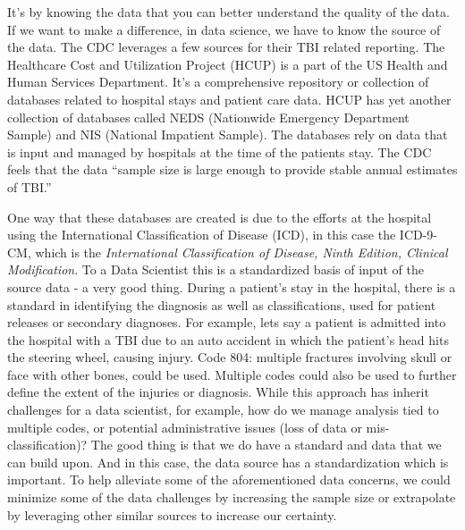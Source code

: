 \documentclass[sigconf]{acmart}
\begin{document}
It's by knowing the data that you can better understand the quality of the data.  If we want to make a difference, in data science, we have to know the source of the data.  The CDC leverages a few sources for their TBI related reporting.  The Healthcare Cost and Utilization Project (HCUP) is a part of the US Health and Human Services Department.  It's a comprehensive repository or collection of databases related to hospital stays and patient care data.  HCUP has yet another collection of databases called NEDS (Nationwide Emergency Department Sample) and NIS (National Impatient Sample).  The databases rely on data that is input and managed by hospitals at the time of the patients stay.  The CDC feels that the data ``sample size is large enough to provide stable annual estimates of TBI.''  

One way that these databases are created is due to the efforts at the hospital using the International Classification of Disease (ICD), in this case the ICD-9-CM, which is the {\em International Classification of Disease, Ninth Edition, Clinical Modification}.  To a Data Scientist this is a standardized basis of input of the source data - a very good thing.  During a patient's stay in the hospital, there is a standard in identifying the diagnosis as well as classifications, used for patient releases or secondary diagnoses.  For example, lets say a patient is admitted into the hospital with a TBI due to an auto accident in which the patient's head hits the steering wheel, causing injury. Code 804: multiple fractures involving skull or face with other bones, could be used.  Multiple codes could also be used to further define the extent of the injuries or diagnosis.  While this approach has inherit challenges for a data scientist, for example, how do we manage analysis tied to multiple codes, or potential administrative issues (loss of data or mis-classification)? The good thing is that we do have a standard and data that we can build upon.  And in this case, the data source has a standardization which is important. To help alleviate some of the aforementioned data concerns, we could minimize some of the data challenges by increasing the sample size or extrapolate by leveraging other similar sources to increase our certainty.
\end{document}
